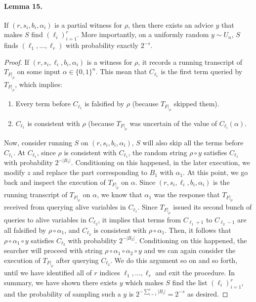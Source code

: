 \paragraph{Lemma 15.} If $(r,s_i,b_i,\alpha_i)$ is a partial witness for $\rho$, then there exists an advice $y$ that makes $S$ find $(\ell_i)_{i=1}^r$. More importantly, on a uniformly random $y\sim U_n$, $S$ finds $(\ell_1,\ldots,\ell_r)$ with probability exactly $2^{-s}$.
\begin{proof}If $(r,s_i,\ell_i,b_i,\alpha_i)$ is a witness for $\rho$, it records a running transcript of $T_{F|_\rho}$ on some input $\alpha\in\{0,1\}^n$. This mean that $C_{\ell_1}$ is the first term queried by $T_{F|_\rho}$, which implies:
\begin{enumerate}\item Every term before $C_{\ell_1}$ is falsified by $\rho$ (because $T_{F|_\rho}$ skipped them).
\item $C_{\ell_1}$ is consistent with $\rho$ (because $T_{F|_\rho}$ was uncertain of the value of $C_{\ell_i}(\alpha)$.\end{enumerate}
Now, consider running $S$ on $(r,s_i,b_i,\alpha_i)$, $S$ will also skip all the terms before $C_{\ell_1}$. At $C_{\ell_1}$, since $\rho$ is consistent with $C_{\ell_1}$, the random string $\rho\circ y$ satisfies $C_{\ell_1}$ with probability $2^{-|B_1|}$. Conditioning on this happened, in the later execution, we modify $z$ and replace the part corresponding to $B_1$ with $\alpha_1$.
At this point, we go back and inspect the execution of $T_{F|_\rho}$ on $\alpha$. Since $(r,s_i,\ell_i,b_i,\alpha_i)$ is the running transcript of $T_{F|_\rho}$ on $\alpha$, we know that $\alpha_1$ was the response that $T_{F|_\rho}$ received from querying alive variables in $C_{\ell_1}$. Since $T_{F|_\rho}$ issued its second bunch of queries to alive variables in $C_{\ell_2}$, it implies that terms from $C_{\ell_1+1}$ to $C_{\ell_2-1}$ are all falsified by $\rho\circ\alpha_1$, and $C_{\ell_2}$ is consistent with $\rho\circ\alpha_1$. Then, it follows that $\rho\circ\alpha_1\circ y$ satisfies $C_{\ell_2}$ with probability $2^{-|B_2|}$. Conditioning on this happened, the searcher will proceed with string $\rho\circ\alpha_1\circ\alpha_2\circ y$ and we can again consider the execution of $T_{F|_\rho}$ after querying $C_{\ell_2}$. We do this argument so on and so forth, until we have identified all of $r$ indices $\ell_1,\ldots,\ell_r$ and exit the procedure. In summary, we have shown there exists $y$ which makes $S$ find the list $(\ell_i)_{i=1}^r$, and the probability of sampling such a $y$ is $2^{-\sum_{i=1}^c|B_i|}=2^{-s}$ as desired.\end{proof}
